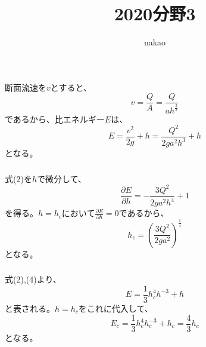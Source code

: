 \documentclass[a4paper]{jsarticle}
\begin{document}
\title{2020分野3}
\author{nakao}
\maketitle

\section{}
\subsection{}
\subsubsection{}
断面流速を$v$とすると、
\begin{equation}
  v = \frac{Q}{A} = \frac{Q}{a h^{\frac{3}{2}}}
\end{equation}
であるから、比エネルギー$E$は、
\begin{equation}
  E = \frac{v^2}{2g} + h = \frac{Q^2}{2g a^2 h^3} + h
\end{equation}
となる。

\subsubsection{}
式(2)を$h$で微分して、
\begin{equation}
  \frac{\partial E}{\partial h} = -\frac{3 Q^2}{2g a^2 h^4} + 1
\end{equation}
を得る。$h = h_c$において$\frac{\partial E}{\partial h} = 0$であるから、
\begin{equation}
  h_c = \left(\frac{3 Q^2}{2 g a^2}\right)^{\frac{1}{4}}
\end{equation}
となる。

\subsubsection{}
式(2),(4)より、
\begin{equation}
  E = \frac{1}{3} h_c^4 h^{-3} + h
\end{equation}
と表される。$h = h_c$をこれに代入して、
\begin{equation}
  E_c = \frac{1}{3} h_c^4 h_c^{-3} + h_c = \frac{4}{3} h_c
\end{equation}
となる。
\end{document}

